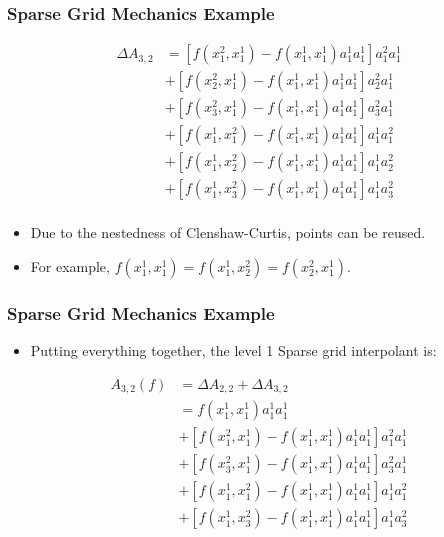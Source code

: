 \documentclass{beamer}
\begin{document}
\begin{frame}
\frametitle{Sparse Grid Mechanics Example}

\begin{align*}
 \Delta A_{3,2} &= \left[f(x_{1}^{2},x_{1}^{1}) -
  f\left(x_{1}^{1},x_{1}^{1}\right)a_{1}^{1}a_{1}^{1}\right]a_{1}^{2}a_{1}^{1} \\
  &+ \left[f(x_{2}^{2},x_{1}^{1}) -
  f\left(x_{1}^{1},x_{1}^{1}\right)a_{1}^{1}a_{1}^{1}\right]a_{2}^{2}a_{1}^{1} \\ 
  &+ \left[f(x_{3}^{2},x_{1}^{1}) -
  f\left(x_{1}^{1},x_{1}^{1}\right)a_{1}^{1}a_{1}^{1}\right]a_{3}^{2}a_{1}^{1} \\  
  &+ \left[f(x_{1}^{1},x_{1}^{2}) -
  f\left(x_{1}^{1},x_{1}^{1}\right)a_{1}^{1}a_{1}^{1}\right]a_{1}^{1}a_{1}^{2} \\
  &+ \left[f(x_{1}^{1},x_{2}^{2}) -
  f\left(x_{1}^{1},x_{1}^{1}\right)a_{1}^{1}a_{1}^{1}\right]a_{1}^{1}a_{2}^{2} \\
  &+ \left[f(x_{1}^{1},x_{3}^{2}) -
  f\left(x_{1}^{1},x_{1}^{1}\right)a_{1}^{1}a_{1}^{1}\right]a_{1}^{1}a_{3}^{2} \\  
\end{align*}

\begin{itemize}
  \item Due to the nestedness of Clenshaw-Curtis, points can be reused.
  \item For example, $f(x_1^1, x_1^1) = f(x_1^1, x_2^2) = f(x_2^2, x_1^1)$.
\end{itemize}

\end{frame}
\begin{frame}
\frametitle{Sparse Grid Mechanics Example}

\begin{itemize}
  \item Putting everything together, the level 1 Sparse grid interpolant is:
\end{itemize}

\begin{align*}
 A_{3,2}(f) &= \Delta A_{2,2} + \Delta A_{3,2} \\
  &= f\left(x_{1}^{1},x_{1}^{1}\right)a_{1}^{1}a_{1}^{1} \\
  &+ \left[f(x_{1}^{2},x_{1}^{1}) -
  f\left(x_{1}^{1},x_{1}^{1}\right)a_{1}^{1}a_{1}^{1}\right]a_{1}^{2}a_{1}^{1} \\
  &+ \left[f(x_{3}^{2},x_{1}^{1}) -
  f\left(x_{1}^{1},x_{1}^{1}\right)a_{1}^{1}a_{1}^{1}\right]a_{3}^{2}a_{1}^{1} \\  
  &+ \left[f(x_{1}^{1},x_{1}^{2}) -
  f\left(x_{1}^{1},x_{1}^{1}\right)a_{1}^{1}a_{1}^{1}\right]a_{1}^{1}a_{1}^{2} \\
  &+ \left[f(x_{1}^{1},x_{3}^{2}) -
  f\left(x_{1}^{1},x_{1}^{1}\right)a_{1}^{1}a_{1}^{1}\right]a_{1}^{1}a_{3}^{2} \\  
\end{align*}

\end{frame}
\end{document}

